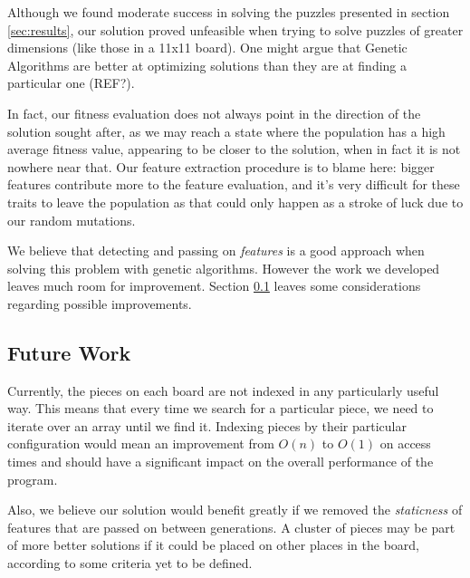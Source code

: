 \documentclass{llncs}
\begin{document}
Although we found moderate success in solving the puzzles presented in section \ref{sec:results}, our solution proved unfeasible when trying to solve puzzles of greater dimensions (like those in a 11x11 board). One might argue that Genetic Algorithms are better at optimizing solutions than they are at finding a particular one (REF?).

In fact, our fitness evaluation does not always point in the direction of the solution sought after, as we may reach a state where the population has a high average fitness value, appearing to be closer to the solution, when in fact it is not nowhere near that. Our feature extraction procedure is to blame here: bigger features contribute more to the feature evaluation, and it's very difficult for these traits to leave the population as that could only happen as a stroke of luck due to our random mutations.

We believe that detecting and passing on \textit{features} is a good approach when solving this problem with genetic algorithms. However the work we developed leaves much room for improvement. Section \ref{sec:future_work} leaves some considerations regarding possible improvements.

\subsection{Future Work}\label{sec:future_work}

Currently, the pieces on each board are not indexed in any particularly useful way. This means that every time we search for a particular piece, we need to iterate over an array until we find it. Indexing pieces by their particular configuration would mean an improvement from $O(n)$ to $O(1)$ on access times and should have a significant impact on the overall performance of the program.

Also, we believe our solution would benefit greatly if we removed the \textit{staticness} of features that are passed on between generations. A cluster of pieces may be part of more better solutions if it could be placed on other places in the board, according to some criteria yet to be defined.





\newpage
\end{document}
